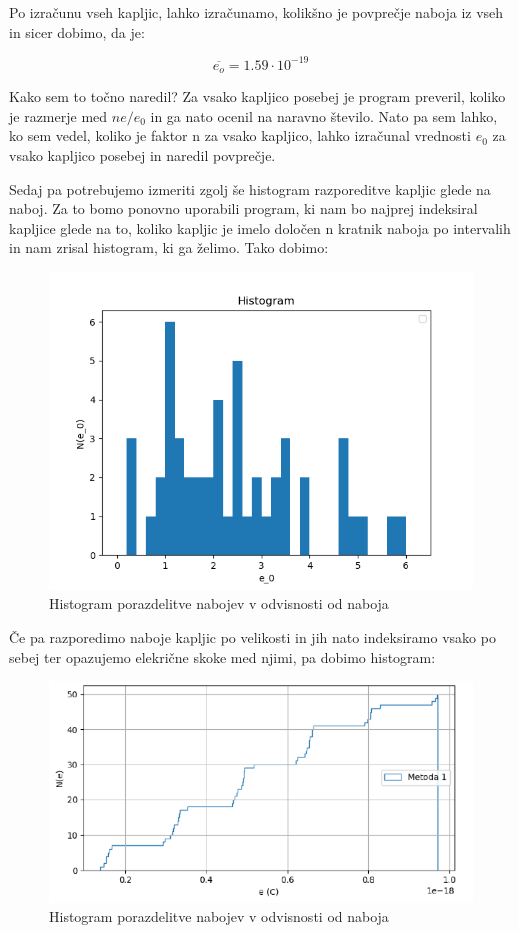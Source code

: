 \documentclass[11pt, a4paper]{article}
\theoremstyle{definition}
\theoremstyle{example}
\theoremstyle{izrek}
\begin{document}
Po izračunu vseh kapljic, lahko izračunamo, kolikšno je povprečje naboja iz vseh in sicer dobimo, da je:

$$\overline{e_o}= 1.59\cdot 10^{-19} $$

Kako sem to točno naredil?
Za vsako kapljico posebej je program preveril, koliko je razmerje med $ne/e_0$ in ga nato ocenil na naravno število. Nato pa sem lahko, ko sem vedel, koliko je faktor n za vsako kapljico, lahko izračunal vrednosti $e_0$ za vsako kapljico posebej in naredil povprečje. 

\pagebreak

Sedaj pa potrebujemo izmeriti zgolj še histogram razporeditve kapljic glede na naboj. Za to bomo ponovno uporabili program, ki nam bo najprej indeksiral kapljice glede na to, koliko kapljic je imelo določen n kratnik naboja po intervalih in nam zrisal histogram, ki ga želimo. Tako dobimo:

\begin{figure}[H]
	\centering
    \includegraphics[width=12cm]{Gravitacija,histogram.png}
    \caption{Histogram porazdelitve nabojev v odvisnosti od naboja}
\end{figure}
Če pa razporedimo naboje kapljic po velikosti in jih nato indeksiramo vsako po sebej ter opazujemo elekrične skoke med njimi, pa dobimo histogram:
\begin{figure}[H]
	\centering
    \includegraphics[width=12cm]{Pravilen histogram,GM.png}
    \caption{Histogram porazdelitve nabojev v odvisnosti od naboja}
\end{figure}
\end{document}
